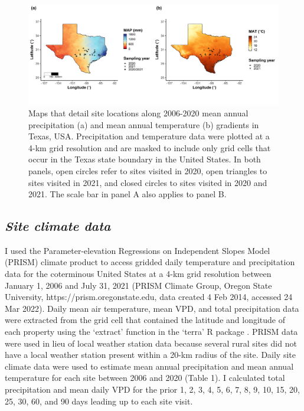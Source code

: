 \newpage
\begin{landscape}
    \begin{figure}
        \centering
        \includegraphics[scale = 0.049]{ch4_TXeco/figs/TXeco_fig1_site_map.png}
        \caption[Maps that detail site locations along 2006-2020 mean annual precipitation and mean annual temperature gradients in Texas, USA.]{Maps that detail site locations along 2006-2020 mean annual precipitation (a) and mean annual temperature (b) gradients in Texas, USA. Precipitation and temperature data were plotted at a 4-km grid resolution and are masked to include only grid cells that occur in the Texas state boundary in the United States. In both panels, open circles refer to sites visited in 2020, open triangles to sites visited in 2021, and closed circles to sites visited in 2020 and 2021. The scale bar in panel A also applies to panel B.}
        \label{fig:figure4.1}
    \end{figure}
\end{landscape}
\clearpage

\subsection{\textit{Site climate data}}
\noindent I used the Parameter-elevation Regressions on Independent Slopes Model (PRISM) climate product to access gridded daily temperature and precipitation data for the coterminous United States at a 4-km grid resolution between January 1, 2006 and July 31, 2021 (PRISM Climate Group, Oregon State University, https://prism.oregonstate.edu, data created 4 Feb 2014, accessed 24 Mar 2022). Daily mean air temperature, mean VPD, and total precipitation data were extracted from the grid cell that contained the latitude and longitude of each property using the ‘extract’ function in the ‘terra’ R package . PRISM data were used in lieu of local weather station data because several rural sites did not have a local weather station present within a 20-km radius of the site. Daily site climate data were used to estimate mean annual precipitation and mean annual temperature for each site between 2006 and 2020 (Table 1). I calculated total precipitation and mean daily VPD for the prior 1, 2, 3, 4, 5, 6, 7, 8, 9, 10, 15, 20, 25, 30, 60, and 90 days leading up to each site visit.

